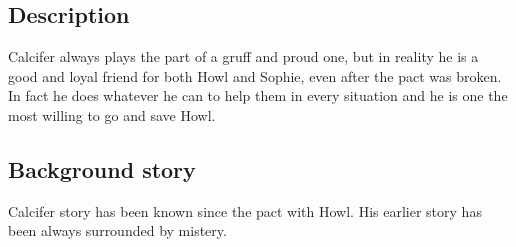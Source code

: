 \subsection{Description}
Calcifer always plays the part of a gruff and proud one, but in reality he is a good and loyal friend for both Howl and Sophie, even after the pact was broken. In fact he does whatever he can to help them in every situation and he is one the most willing to go and save Howl.

\subsection{Background story}
Calcifer story has been known since the pact with Howl. His earlier story has been always surrounded by mistery.
